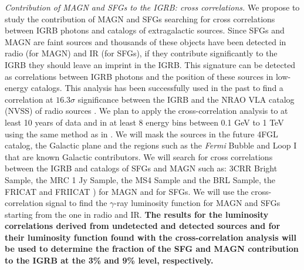 \documentclass[12 pt]{article}
\begin{document}




{\it Contribution of MAGN and SFGs to the IGRB: cross correlations.} 
We propose to study the contribution of MAGN and SFGs searching for cross correlations between IGRB photons and catalogs of extragalactic sources.
Since SFGs and MAGN are faint sources and thousands of these objects have been detected in radio (for MAGN) and IR (for SFGs), if they contribute significantly to the IGRB they should leave an imprint in the IGRB.
This signature can be detected as correlations between IGRB photons and the position of these sources in low-energy catalogs.
This analysis has been successfully used in the past to find a correlation at $16.3\sigma$ significance between the IGRB and the NRAO VLA catalog (NVSS) of radio sources \cite{Cuoco:2017bpv}.
We plan to apply the cross-correlation analysis to at least 10 years of data and in at least 8 energy bins between 0.1 GeV to 1 TeV using the same method as in \cite{Cuoco:2017bpv}. We will mask the sources in the future 4FGL catalog, the Galactic plane and the regions such as the {\it Fermi} Bubble and Loop I that are known Galactic contributors. 
We will search for cross correlations between the IGRB and catalogs of SFGs and MAGN such as: 3CRR Bright Sample, the MRC 1 Jy Sample, the MS4 Sample and the BRL Sample, the FRICAT \cite{Capetti:2016srb} and FRIICAT \cite{Capetti:2017fjb}) for MAGN and \cite{Sanders:2003ms,2004ApJ...606..271G} for SFGs.
We will use the cross-correlation signal to find the $\gamma$-ray luminosity function for MAGN and SFGs starting from the one in radio and IR.
{\bf The results for the luminosity correlations derived from undetected and detected sources and for their luminosity function found with the cross-correlation analysis will be used to determine the fraction of the SFG and MAGN contribution to the IGRB at the 3\% and 9\% level, respectively.}
\end{document}
